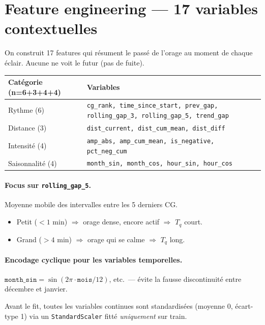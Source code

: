 \documentclass[11pt,a4paper]{article}
\begin{document}
\section{Feature engineering — 17 variables contextuelles}

On construit 17 features qui résument le passé de l'orage au moment de chaque éclair.
Aucune ne voit le futur (pas de fuite).

\begin{table}[H]
\centering
\small
\begin{tabular}{lp{9.5cm}}
\toprule
\textbf{Catégorie (n=6+3+4+4)} & \textbf{Variables} \\
\midrule
Rythme (6)      & \texttt{cg\_rank, time\_since\_start, prev\_gap, rolling\_gap\_3, rolling\_gap\_5, trend\_gap} \\
Distance (3)    & \texttt{dist\_current, dist\_cum\_mean, dist\_diff} \\
Intensité (4)   & \texttt{amp\_abs, amp\_cum\_mean, is\_negative, pct\_neg\_cum} \\
Saisonnalité (4) & \texttt{month\_sin, month\_cos, hour\_sin, hour\_cos} \\
\bottomrule
\end{tabular}
\end{table}

\paragraph{Focus sur \texttt{rolling\_gap\_5}.}
Moyenne mobile des intervalles entre les 5 derniers CG.
\begin{itemize}[topsep=2pt]
    \item Petit ($<1$ min) $\Rightarrow$ orage dense, encore actif $\Rightarrow$ $T_q$ court.
    \item Grand ($>4$ min) $\Rightarrow$ orage qui se calme $\Rightarrow$ $T_q$ long.
\end{itemize}

\paragraph{Encodage cyclique pour les variables temporelles.}
$\texttt{month\_sin} = \sin(2\pi \cdot \texttt{mois}/12)$, etc.\ — évite la fausse
discontinuité entre décembre et janvier.

Avant le fit, toutes les variables continues sont standardisées (moyenne 0, écart-type 1)
via un \texttt{StandardScaler} fitté \emph{uniquement} sur train.
\end{document}
